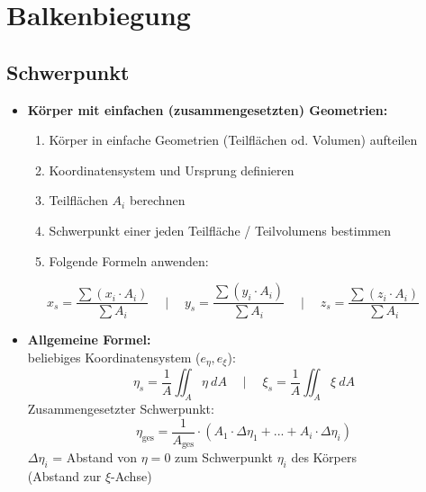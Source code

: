 \documentclass[numerate]{cheatsheet}
\begin{document}
    \section{Balkenbiegung}
    \subsection{Schwerpunkt}
        \begin{scriptsize}
            \begin{itemize}
                \item \textbf{Körper mit einfachen (zusammengesetzten) Geometrien:}
                \begin{enumerate}
                    \item Körper in einfache Geometrien (Teilflächen od. Volumen) aufteilen
                    \item Koordinatensystem und Ursprung definieren
                    \item Teilflächen $A_i$ berechnen
                    \item Schwerpunkt einer jeden Teilfläche / Teilvolumens bestimmen
                    \item Folgende Formeln anwenden:
                \end{enumerate}
            \end{itemize}
            $$ x_s = \frac{\sum (x_i \cdot A_i)}{\sum A_i} \quad \mid \quad y_s = \frac{\sum (y_i \cdot A_i)}{\sum A_i} \quad \mid \quad z_s = \frac{\sum (z_i \cdot A_i)}{\sum A_i}$$
            \begin{itemize}
                \item \textbf{Allgemeine Formel:}
                \\ beliebiges Koordinatensystem ($e_{\eta}, e_{\xi}$):
                $$ \eta_s = \frac{1}{A} \iint_A \eta \ dA \quad \mid \quad \xi_s = \frac{1}{A} \iint_A \xi \ dA$$
                Zusammengesetzter Schwerpunkt:
                $$\eta_{\text{ges}} = \frac{1}{A_{\text{ges}}} \cdot (A_1 \cdot \Delta \eta_1 + ... + A_i \cdot \Delta \eta_i)$$
                $\Delta \eta_i$ = Abstand von $\eta = 0$ zum Schwerpunkt $\eta_i$ des Körpers \\(Abstand zur $\xi$-Achse)
            \end{itemize}
        \end{scriptsize}
\end{document}
